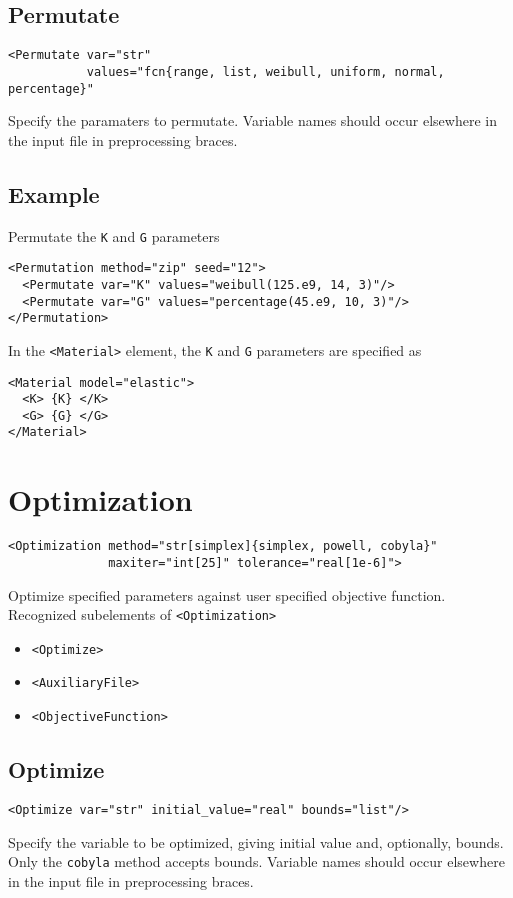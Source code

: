 \documentclass[11pt]{report}
\newcommand{\tag}[1]{\texttt{<#1>}}
\begin{document}
\subsection{Permutate}
\begin{verbatim}
<Permutate var="str"
           values="fcn{range, list, weibull, uniform, normal, percentage}"
\end{verbatim}
%
Specify the paramaters to permutate. Variable names should occur elsewhere in
the input file in preprocessing braces.

\subsection{Example}
Permutate the \texttt{K} and \texttt{G} parameters
%
\begin{verbatim}
<Permutation method="zip" seed="12">
  <Permutate var="K" values="weibull(125.e9, 14, 3)"/>
  <Permutate var="G" values="percentage(45.e9, 10, 3)"/>
</Permutation>
\end{verbatim}

In the \tag{Material} element, the \texttt{K} and \texttt{G} parameters are
specified as
%
\begin{verbatim}
<Material model="elastic">
  <K> {K} </K>
  <G> {G} </G>
</Material>
\end{verbatim}


\section{Optimization}
\begin{verbatim}
<Optimization method="str[simplex]{simplex, powell, cobyla}"
              maxiter="int[25]" tolerance="real[1e-6]">
\end{verbatim}
%
Optimize specified parameters against user specified objective function.
Recognized subelements of \tag{Optimization}

\begin{itemize}
  \item \tag{Optimize}
  \item \tag{AuxiliaryFile}
  \item \tag{ObjectiveFunction}
\end{itemize}

\subsection{Optimize}
\begin{verbatim}
<Optimize var="str" initial_value="real" bounds="list"/>
\end{verbatim}
%
Specify the variable to be optimized, giving initial value and, optionally,
bounds.  Only the \texttt{cobyla} method accepts bounds.  Variable names should
occur elsewhere in the input file in preprocessing braces.
\end{document}
